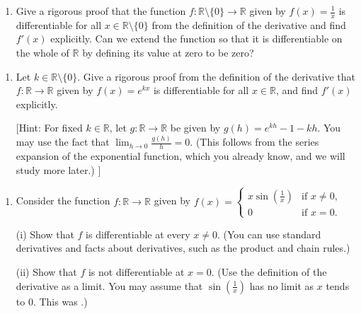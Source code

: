 \documentclass[letterpaper,10pt,english]{jupyterBook}
\begin{document}
\label{\detokenize{Problems:id39}}\begin{enumerate}
%
\setcounter{enumi}{38}
\item {} 
\sphinxAtStartPar
Give a rigorous proof that the function \(f:\mathbb{R}\setminus\{0\}\to \mathbb{R}\) given by
\(f(x) = \frac{1}{x}\) is differentiable for all \(x \in \mathbb{R} \setminus \{0\}\) from the definition of the derivative and find \(f'(x)\) explicitly. Can we extend the function so that it is differentiable on the whole of \(\mathbb{R}\) by defining its value at zero to be zero?

\end{enumerate}
\label{\detokenize{Problems:id40}}\begin{enumerate}
%
\setcounter{enumi}{39}
\item {} 
\sphinxAtStartPar
Let \(k\in \mathbb{R}\setminus\{0\}\). Give a rigorous proof from the definition of the derivative that  \(f:\mathbb{R}\to \mathbb{R}\) given by  \(f(x) = e^{kx}\) is differentiable for all \(x \in \mathbb{R}\), and find \(f'(x)\) explicitly.

{[}Hint: For fixed \(k\in \mathbb{R}\), let \(g:\mathbb{R}\to\mathbb{R}\) be given by \(g(h)=e^{kh} - 1 - kh \).
You may use the fact that  \(\displaystyle\lim_{h \rightarrow 0}\frac{g(h)}{h} = 0\). (This follows from the series expansion of the exponential function, which you already know, and we will study more later.) {]}

\end{enumerate}
\label{\detokenize{Problems:id41}}\begin{enumerate}
%
\setcounter{enumi}{40}
\item {} 
\sphinxAtStartPar
Consider the function  \(f:\mathbb{R}\to \mathbb{R}\) given by \(f(x) = \begin{cases} x\sin\left(\frac{1}{x}\right) & \text{if }x \neq 0,\\ 0 & \text{if }x = 0.\end{cases}\)

\sphinxAtStartPar
(i) Show that \(f\) is differentiable at every \(x \neq 0\). (You can use standard derivatives and facts about derivatives, such as the product and chain rules.)

\sphinxAtStartPar
(ii) Show that \(f\) is not differentiable at \(x = 0\). (Use the definition of the derivative as a limit. You may assume that \(\sin\left(\frac{1}{x}\right)\) has no limit as \(x\) tends to \(0\). This was {\hyperref[\detokenize{Problems:id8}]{}}.)

\end{enumerate}
\end{document}
